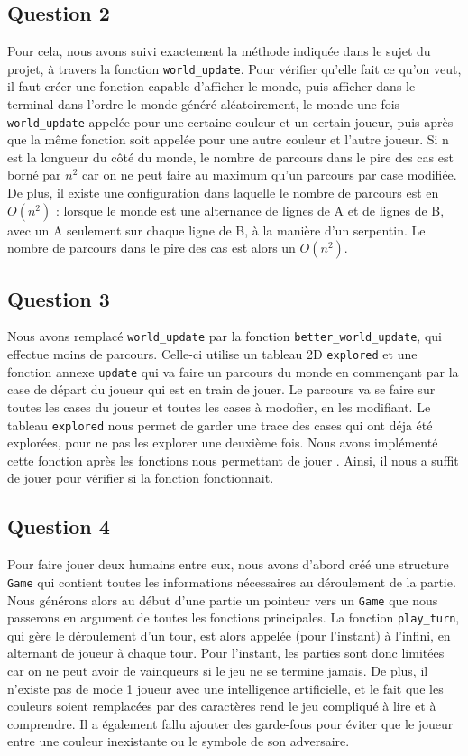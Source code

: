 \documentclass{article}
\begin{document}
\subsection{Question 2}
    Pour cela, nous avons suivi exactement la méthode indiquée dans le sujet du projet, à travers la fonction \texttt{world\_update}. Pour vérifier qu'elle fait ce qu'on veut, il faut créer une fonction capable d'afficher le monde, puis afficher dans le terminal dans l'ordre le monde généré aléatoirement, le monde une fois \texttt{world\_update} appelée pour une certaine couleur et un certain joueur, puis après que la même fonction soit appelée pour une autre couleur et l'autre joueur. Si n est la longueur du côté du monde, le nombre de parcours dans le pire des cas est borné par $n^2$ car on ne peut faire au maximum qu'un parcours par case modifiée. De plus, il existe une configuration dans laquelle le nombre de parcours est en $O(n^2)$ : lorsque le monde est une alternance de lignes de A et de lignes de B, avec un A seulement sur chaque ligne de B, à la manière d'un serpentin. Le nombre de parcours dans le pire des cas est alors un $O(n^2)$.
\subsection{Question 3}
    Nous avons remplacé \texttt{world\_update} par la fonction \texttt{better\_world\_update}, qui effectue moins de parcours. Celle-ci utilise un tableau 2D \texttt{explored} et une fonction annexe \texttt{update} qui va faire un parcours du monde en commençant par la case de départ du joueur qui est en train de jouer. Le parcours va se faire sur toutes les cases du joueur et toutes les cases à modofier, en les modifiant. Le tableau \texttt{explored} nous permet de garder une trace des cases qui ont déja été explorées, pour ne pas les explorer une deuxième fois. Nous avons implémenté cette fonction après les fonctions nous permettant de jouer . Ainsi, il nous a suffit de jouer pour vérifier si la fonction fonctionnait.
\subsection{Question 4}
    Pour faire jouer deux humains entre eux, nous avons d'abord créé une structure \texttt{Game} qui contient toutes les informations nécessaires au déroulement de la partie. Nous générons alors au début d'une partie un pointeur vers un \texttt{Game} que nous passerons en argument de toutes les fonctions principales. La fonction \texttt{play\_turn}, qui gère le déroulement d'un tour, est alors appelée (pour l'instant) à l'infini, en alternant de joueur à chaque tour. Pour l'instant, les parties sont donc limitées car on ne peut avoir de vainqueurs si le jeu ne se termine jamais. De plus, il n'existe pas de mode 1 joueur avec une intelligence artificielle, et le fait que les couleurs soient remplacées par des caractères rend le jeu compliqué à lire et à comprendre. Il a également fallu ajouter des garde-fous pour éviter que le joueur entre une couleur inexistante ou le symbole de son adversaire.
\end{document}
